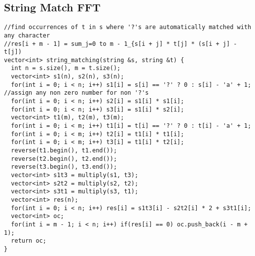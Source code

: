 \documentclass[10pt,a4paper,onesided]{article}
\begin{document}
\begin{multicols*}{3}
\subsection{String Match FFT}
\begin{lstlisting}
//find occurrences of t in s where '?'s are automatically matched with any character
//res[i + m - 1] = sum_j=0 to m - 1_{s[i + j] * t[j] * (s[i + j] - t[j])
vector<int> string_matching(string &s, string &t) {
  int n = s.size(), m = t.size();
  vector<int> s1(n), s2(n), s3(n);
  for(int i = 0; i < n; i++) s1[i] = s[i] == '?' ? 0 : s[i] - 'a' + 1; //assign any non zero number for non '?'s
  for(int i = 0; i < n; i++) s2[i] = s1[i] * s1[i];
  for(int i = 0; i < n; i++) s3[i] = s1[i] * s2[i];
  vector<int> t1(m), t2(m), t3(m);
  for(int i = 0; i < m; i++) t1[i] = t[i] == '?' ? 0 : t[i] - 'a' + 1;
  for(int i = 0; i < m; i++) t2[i] = t1[i] * t1[i];
  for(int i = 0; i < m; i++) t3[i] = t1[i] * t2[i];
  reverse(t1.begin(), t1.end());
  reverse(t2.begin(), t2.end());
  reverse(t3.begin(), t3.end());
  vector<int> s1t3 = multiply(s1, t3);
  vector<int> s2t2 = multiply(s2, t2);
  vector<int> s3t1 = multiply(s3, t1);
  vector<int> res(n);
  for(int i = 0; i < n; i++) res[i] = s1t3[i] - s2t2[i] * 2 + s3t1[i];
  vector<int> oc;
  for(int i = m - 1; i < n; i++) if(res[i] == 0) oc.push_back(i - m + 1);
  return oc;
}
\end{lstlisting}

\end{multicols*}
\end{document}
